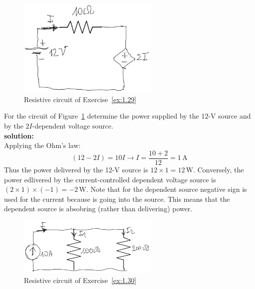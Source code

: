 \begin{figure}[h!]
  \centering
  \includegraphics[width=0.6\textwidth]{"images/Fig-08"}
  \caption{Resistive circuit of Exercise~\ref{ex:1.29}} 
  \label{Fig:Ex:1.29}
\end{figure}

\begin{exercise}
\label{ex:1.29}
For the circuit of Figure~\ref{Fig:Ex:1.29} determine the power supplied by the 12-V source and by the $2I$-dependent voltage source.\\

\textbf{solution:}\\ 
Applying the Ohm's law:
\[(12 - 2I) = 10I \longrightarrow I = \frac{10 + 2}{12} = 1\,\textrm{A}\]
Thus the power delivered by the 12-V source is $12 \times 1 = 12\,\textrm{W}$. Conversely, the power edlivered by the current-controlled dependent voltage source is $(2 \times 1)\times (-1) = -2\,\textrm{W}$.
Note that for the dependent source negative sign is used for the current because is going into the source. This means that the dependent source is absobring (rather than delivering) power. 
\end{exercise}

\begin{figure}[h!]
  \centering
  \includegraphics[width=0.6\textwidth]{"images/Fig-09"}
  \caption{Resistive circuit of Exercise~\ref{ex:1.30}} 
  \label{Fig:Ex:1.30}
\end{figure}

